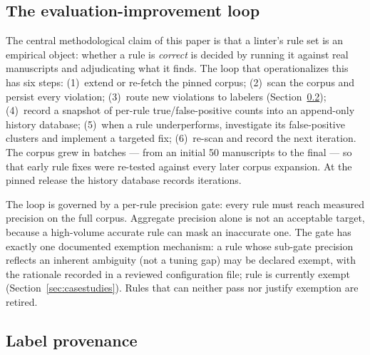 \documentclass[nojss,article]{jss}
\begin{document}
\subsection{The evaluation-improvement loop}
\label{sec:evalloop}

The central methodological claim of this paper is that a linter's
rule set is an empirical object: whether a rule is \emph{correct} is
decided by running it against real manuscripts and adjudicating what
it finds. The loop that operationalizes this has six steps:
(1)~extend or re-fetch the pinned corpus; (2)~scan the corpus and
persist every violation; (3)~route new violations to labelers
(Section~\ref{sec:labeling}); (4)~record a snapshot of per-rule
true/false-positive counts into an append-only history database;
(5)~when a rule underperforms, investigate its false-positive
clusters and implement a targeted fix; (6)~re-scan and record the
next iteration. The corpus grew in batches --- from an initial 50
manuscripts to the final \StatCorpusSize{} --- so that early rule
fixes were re-tested against every later corpus expansion. At the
pinned release the history database records \StatIterationCount{}
iterations.

The loop is governed by a per-rule precision gate: every rule must
reach \StatGatePct{} measured precision on the full corpus.
Aggregate precision alone is not an acceptable target, because a
high-volume accurate rule can mask an inaccurate one. The gate has
exactly one documented exemption mechanism: a rule whose sub-gate
precision reflects an inherent ambiguity (not a tuning gap) may be
declared exempt, with the rationale recorded in a reviewed
configuration file; \StatGateExemptCount{} rule is currently exempt
(Section~\ref{sec:casestudies}). Rules that can neither pass nor
justify exemption are retired.

\subsection{Label provenance}
\label{sec:labeling}
\end{document}
